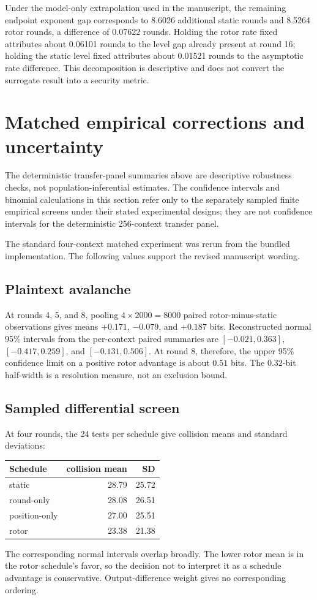 \documentclass[cryptography,supfile,submit,oneauthor]{Definitions/mdpi}
\begin{document}
Under the model-only extrapolation used in the manuscript, the remaining endpoint exponent gap corresponds to 8.6026 additional static rounds and 8.5264 rotor rounds, a difference of 0.07622 rounds. Holding the rotor rate fixed attributes about 0.06101 rounds to the level gap already present at round 16; holding the static level fixed attributes about 0.01521 rounds to the asymptotic rate difference. This decomposition is descriptive and does not convert the surrogate result into a security metric.

\section{Matched empirical corrections and uncertainty}
The deterministic transfer-panel summaries above are descriptive robustness checks, not population-inferential estimates. The confidence intervals and binomial calculations in this section refer only to the separately sampled finite empirical screens under their stated experimental designs; they are not confidence intervals for the deterministic 256-context transfer panel.

The standard four-context matched experiment was rerun from the bundled implementation. The following values support the revised manuscript wording.

\subsection{Plaintext avalanche}
At rounds 4, 5, and 8, pooling $4\times2000=8000$ paired rotor-minus-static observations gives means $+0.171$, $-0.079$, and $+0.187$ bits. Reconstructed normal 95\% intervals from the per-context paired summaries are $[-0.021,0.363]$, $[-0.417,0.259]$, and $[-0.131,0.506]$. At round 8, therefore, the upper 95\% confidence limit on a positive rotor advantage is about $0.51$ bits. The $0.32$-bit half-width is a resolution measure, not an exclusion bound.

\subsection{Sampled differential screen}
At four rounds, the 24 tests per schedule give collision means and standard deviations:
\begin{center}\small
\begin{tabular}{lrr}
\toprule
Schedule & collision mean & SD\\
\midrule
static & 28.79 & 25.72\\
round-only & 28.08 & 26.51\\
position-only & 27.00 & 25.51\\
rotor & 23.38 & 21.38\\
\bottomrule
\end{tabular}
\end{center}
The corresponding normal intervals overlap broadly. The lower rotor mean is in the rotor schedule's favor, so the decision not to interpret it as a schedule advantage is conservative. Output-difference weight gives no corresponding ordering.
\end{document}
